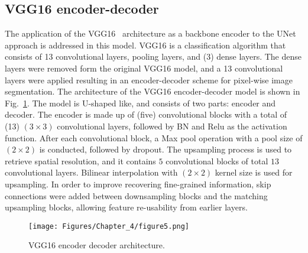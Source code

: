 \subsection{VGG16 encoder-decoder}
\label{sec433}
The application of the VGG16~\cite{Simonyan2015} architecture as a backbone encoder to the UNet~\cite{Ronneberger2015} approach is addressed in this model.
VGG16 is a classification algorithm that consists of 13 convolutional layers, pooling layers, and (3) dense layers.
The dense layers were removed form the original VGG16 model, and a 13 convolutional layers were applied resulting in an encoder-decoder scheme for pixel-wise image segmentation.
The architecture of the VGG16 encoder-decoder model is shown in Fig.~\ref{vgg16}.
The model is U-shaped like, and consists of two parts: encoder and decoder.
The encoder is made up of (five) convolutional blocks with a total of (13) \((3\times3)\) convolutional layers, followed by BN and Relu as the activation function.
After each convolutional block, a Max pool operation with a pool size of \((2\times2)\) is conducted, followed by dropout. 
The upsampling process is used to retrieve spatial resolution, and it contains \(5\) convolutional blocks of total \(13\) convolutional layers.
Bilinear interpolation with \((2\times2)\) kernel size is used for upsampling.
In order to improve recovering fine-grained information, skip connections were added between downsampling blocks and the matching upsampling blocks, allowing feature re-usability from earlier layers.
\begin{figure} [h!]
	\begin{center}
		\texttt{[image: Figures/Chapter\_4/figure5.png]}
	\end{center}
	\caption{VGG16 encoder decoder architecture.} 
	\label{vgg16}
\end{figure}

